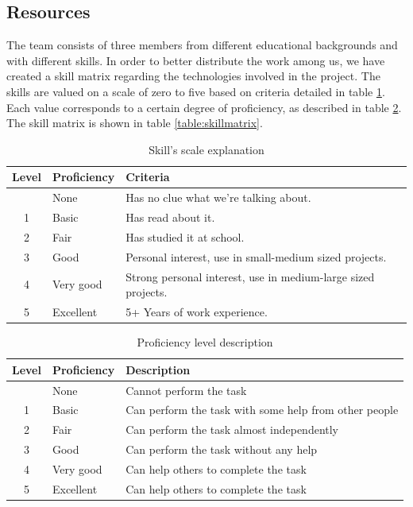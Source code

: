 
\subsection{Resources}
\label{section:resources}
The team consists of three members from different educational backgrounds and with different skills.
In order to better distribute the work among us, we have created a skill matrix regarding the technologies involved
in the project. The skills are valued on a scale of zero to five based on criteria detailed in table
\ref{table:skillscale}. Each value corresponds to a certain degree of proficiency, as described in table
\ref{table:proficiency}. The skill matrix is shown in table \ref{table:skillmatrix}.

\begin{table}[h]
\begin{center}
\begin{tabular}{ | c | l | l | }
  \hline
  Level & Proficiency & Criteria \\
  \hline\noalign{\smallskip}\hline
  0 & None		& Has no clue what we're talking about. \\
  1 & Basic		& Has read about it.\\
  2 & Fair		& Has studied it at school.\\
  3 & Good		& Personal interest, use in small-medium sized projects.\\
  4 & Very good	& Strong personal interest, use in medium-large sized projects. \\
  5 & Excellent	& 5+ Years of work experience. \\
  \hline
\end{tabular}
\end{center}
\caption{Skill's scale explanation}
\label{table:skillscale}
\end{table}

\begin{table}[h]
\begin{center}
\begin{tabular}{ | c | l | l | }
  \hline
  Level & Proficiency & Description \\
  \hline\noalign{\smallskip}\hline
  0 & None		  & Cannot perform the task \\
  1 & Basic     & Can perform the task with some help from other people \\
  2 & Fair		  & Can perform the task almost independently \\
  3 & Good		  & Can perform the task without any help \\
  4 & Very good	& Can help others to complete the task \\
  5 & Excellent	& Can help others to complete the task \\
  \hline
\end{tabular}
\end{center}
\caption{Proficiency level description}
\label{table:proficiency}
\end{table}

